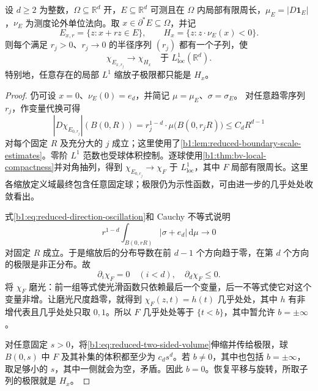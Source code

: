 \begin{lemma}[约化点的缩放极限]
\label{b1:lem:reduced-boundary-set-blowup}
设 \(d\ge2\) 为整数，\(\Omega\subseteq\mathbb R^d\) 开，\(E\subseteq\mathbb R^d\) 可测且在 \(\Omega\) 内局部有限周长，\(\mu_E=|D\mathbf1_E|\)，\(\nu_E\) 为测度论外单位法向。取 \(x\in\partial^*E\subseteq\Omega\)，并记
\[
 E_{x,r}=\{z:x+rz\in E\},\qquad
 H_x=\{z:z\cdot\nu_E(x)<0\}.
\]
则每个满足 \(r_j>0\)、\(r_j\to0\) 的半径序列 \((r_j)\) 都有一个子列，使
\[
 \chi_{E_{x,r_j}}\longrightarrow\chi_{H_x}
 \quad\text{于 }L^1_{\mathrm{loc}}(\mathbb R^d).
\]
特别地，任意存在的局部 \(L^1\) 缩放子极限都只能是 \(H_x\)。
\end{lemma}
\begin{proof}
仍可设 \(x=0\)、\(\nu_E(0)=e_d\)，并简记 \(\mu=\mu_E\)、\(\sigma=\sigma_E\)。
对任意趋零序列 \(r_j\)，作变量代换可得
\[
 |D\chi_{E_{0,r_j}}|(B(0,R))
 =r_j^{1-d}\cdot \mu\bigl(B(0,r_jR)\bigr)\le C_dR^{d-1}
\]
对每个固定 \(R\) 及充分大的 \(j\) 成立；这里使用了\cref{b1:lem:reduced-boundary-scale-estimates}。零阶 \(L^1\) 范数也受球体积控制。逐球使用\cref{b1:thm:bv-local-compactness}并对角抽列，得到
\(\chi_{E_{0,r_j}}\to\chi_F\)
于 \(L^1_{\mathrm{loc}}\)，其中 \(F\) 局部有限周长。这里各缩放定义域最终包含任意固定球；极限仍为示性函数，可由进一步的几乎处处收敛看出。

式\eqref{b1:eq:reduced-direction-oscillation}和 Cauchy 不等式说明
\[
 r^{1-d}\int_{B(0,rR)}|\sigma+e_d|\,\mathrm d\mu
 \longrightarrow0
\]
对固定 \(R\) 成立。于是缩放后的分布导数在前 \(d-1\) 个方向趋于零，在第 \(d\) 个方向的极限是非正分布。故
\[
 \partial_i\chi_F=0\quad(i<d),\quad
 \partial_d\chi_F\le0.
\]
将 \(\chi_F\) 磨光：前一组等式使光滑函数只依赖最后一个变量，后一不等式使它对这个变量非增。让磨光尺度趋零，就得到 \(\chi_F(z,t)=h(t)\) 几乎处处，其中 \(h\) 有非增代表且几乎处处只取 \(0,1\)。所以 \(F\) 几乎处处等于 \(\{t<b\}\)，其中暂允许 \(b=\pm\infty\)。

对任意固定 \(s>0\)，将\eqref{b1:eq:reduced-two-sided-volume}伸缩并传给极限，球 \(B(0,s)\) 中 \(F\) 及其补集的体积都至少为 \(c_ds^d\)。若 \(b\ne0\)，其中也包括 \(b=\pm\infty\)，取足够小的 \(s\)，其中一侧就会为空，矛盾。因此 \(b=0\)。恢复平移与旋转，所取子列的极限就是 \(H_x\)。
\end{proof}

